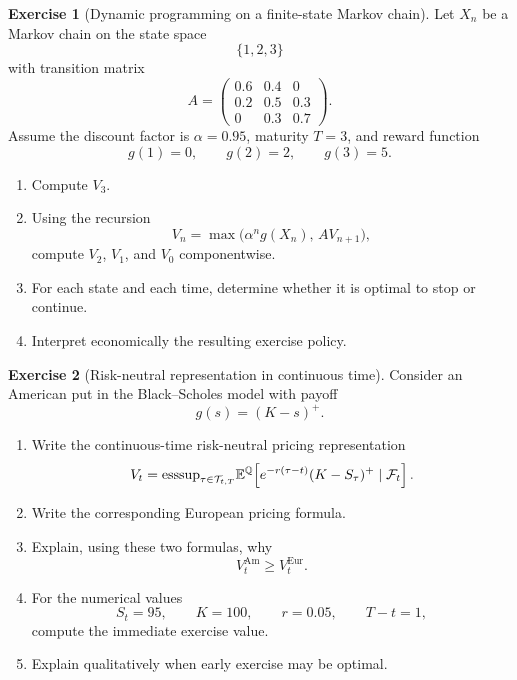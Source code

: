 \documentclass[11pt]{article}
\newcommand{\E}{\mathbb{E}}
\newcommand{\1}{\mathbf{1}}
\theoremstyle{definition}
\newtheorem{exercise}{Exercise}[section]
\begin{document}

\begin{exercise}[Dynamic programming on a finite-state Markov chain]
Let \(X_n\) be a Markov chain on the state space
\[
\{1,2,3\}
\]
with transition matrix
\[
A=
\begin{pmatrix}
0.6 & 0.4 & 0 \\
0.2 & 0.5 & 0.3 \\
0 & 0.3 & 0.7
\end{pmatrix}.
\]
Assume the discount factor is \(\alpha=0.95\), maturity \(T=3\), and reward function
\[
g(1)=0,\qquad g(2)=2,\qquad g(3)=5.
\]

\begin{enumerate}[leftmargin=1.6em]
\item Compute \(V_3\).

\item Using the recursion
\[
V_n = \max\big(\alpha^n g(X_n),\, A V_{n+1}\big),
\]
compute \(V_2\), \(V_1\), and \(V_0\) componentwise.

\item For each state and each time, determine whether it is optimal to stop or continue.

\item Interpret economically the resulting exercise policy.
\end{enumerate}
\end{exercise}


\begin{exercise}[Risk-neutral representation in continuous time]
Consider an American put in the Black--Scholes model with payoff
\[
g(s)=(K-s)^+.
\]

\begin{enumerate}[leftmargin=1.6em]
\item Write the continuous-time risk-neutral pricing representation
\[
V_t={\rm esssup}_{\tau\in\mathcal{T}_{t,T}}
\E^{\mathbb{Q}}\!\left[e^{-r(\tau-t)}(K-S_\tau)^+\mid\mathcal{F}_t\right].
\]

\item Write the corresponding European pricing formula.

\item Explain, using these two formulas, why
\[
V_t^{\mathrm{Am}}\ge V_t^{\mathrm{Eur}}.
\]

\item For the numerical values
\[
S_t=95,\qquad K=100,\qquad r=0.05,\qquad T-t=1,
\]
compute the immediate exercise value.

\item Explain qualitatively when early exercise may be optimal.
\end{enumerate}
\end{exercise}
\end{document}
